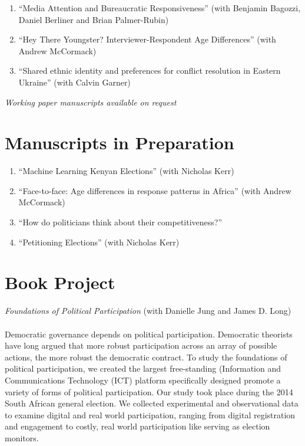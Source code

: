 \documentclass[margin,line]{res}
\begin{document}
{\begin{resume}
\begin{enumerate}
\item ``Media Attention and Bureaucratic Responsiveness'' (with Benjamin
Bagozzi, Daniel Berliner and Brian Palmer-Rubin)

\item ``Hey There Youngster? Interviewer-Respondent Age Differences'' (with Andrew McCormack)

\item ``Shared ethnic identity and preferences for conflict resolution in
Eastern Ukraine'' (with Calvin Garner)

\end{enumerate}
\centerline{\emph{Working paper manuscripts available on request}}


\section{\sc Manuscripts in Preparation}
\renewcommand{\labelenumi}{MP\theenumi.}

\begin{enumerate}
\item ``Machine Learning Kenyan Elections'' (with Nicholas Kerr)
\item ``Face-to-face: Age differences in response patterns in Africa''
  (with Andrew McCormack)
\item ``How do politicians think about their competitiveness?''
\item ``Petitioning Elections'' (with Nicholas Kerr)

\end{enumerate}

\section{\sc Book Project}
\emph{Foundations of Political Participation} (with Danielle Jung and
James D. Long)\\
\\
Democratic governance depends on political
 participation. Democratic theorists have long argued that more
  robust participation across an array of possible actions, the more
  robust the democratic contract. To study the foundations of
  political participation, we created the largest free-standing
  (Information and Communications Technology (ICT) platform
  specifically designed promote a variety of forms of political
  participation. Our study took place during the 2014 South African
  general election. We collected experimental and observational data
  to examine digital and real world participation, ranging from
  digital registration and engagement to costly, real world
  participation like serving as election monitors.



\end{resume}}
\end{document}
